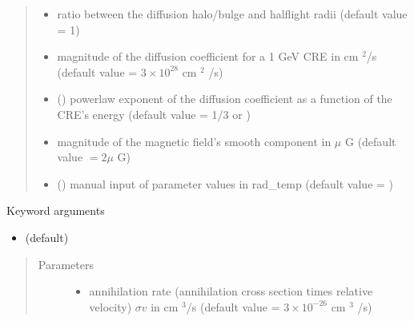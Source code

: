 \documentclass[letterpaper,10pt,english]{sphinxmanual}
\begin{document}
\begin{fulllineitems}
\begin{quote}
\begin{description}
\begin{itemize}
\item {} 
\sphinxAtStartPar
{} \textendash{} ratio between the diffusion halo/bulge and half\sphinxhyphen{}light radii (default value = 1)

\item {} 
\sphinxAtStartPar
{} \textendash{} magnitude of the diffusion coefficient for a 1 GeV CRE in cm \({}^2\)/s (default value = \(3\times 10^{28}\) cm \({}^2\) /s)

\item {} 
\sphinxAtStartPar
{} (\sphinxstyleliteralemphasis{\sphinxupquote{, }}) \textendash{} power\sphinxhyphen{}law exponent of the diffusion coefficient as a function of the CRE’s energy (default value = 1/3 or )

\item {} 
\sphinxAtStartPar
{} \textendash{} magnitude of the magnetic field’s smooth component in \(\mu\) G (default value \(= 2 \mu\) G)

\item {} 
\sphinxAtStartPar
{} () \textendash{} manual input of parameter values in rad\_temp (default value = )

\end{itemize}

\end{description}\end{quote}

\sphinxAtStartPar
Keyword arguments
\begin{itemize}
\item {} 
\sphinxAtStartPar
{}    (default)

\end{itemize}
\begin{quote}\begin{description}
\item[{Parameters}] \leavevmode\begin{itemize}
\item {} 
\sphinxAtStartPar
{} \textendash{} annihilation rate (annihilation cross section times relative velocity) \(\sigma v\) in cm \({}^3\)/s (default value = \(3 \times 10^{-26}\) cm \({}^3\) /s)


\end{itemize}
\end{description}
\end{quote}
\end{fulllineitems}
\end{document}
